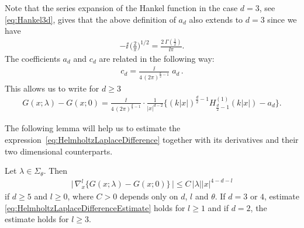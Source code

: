 Note that the series expansion of the Hankel function in the case $d = 3$, see \eqref{eq:Hankel3d}, gives that the above definition of $a_d$ also extends to $d = 3$ since we have
\begin{align*}
  -\ii\, \bigg( \frac{2}{\pi} \bigg)^{1/2} = \frac{2\, \Gamma(\frac{1}{2})}{\ii\pi}.
\end{align*}
The coefficients $a_d$ and $c_d$ are related in the following way:
\begin{align*}
  c_d 
  =\frac{\ii} {4\, (2 \pi)^{\frac{d}{2} - 1}}\; a_d \,.
\end{align*}
This allows us to write for $d \geq 3$
\begin{align}
  \label{eq:HelmholtzLaplaceDifference}
  G(x;\lambda) - G(x; 0) = \frac{\ii}{4\,(2\pi)^{\frac{d}{2} - 1}} \cdot \frac{1}{|x|^{d - 2}} \Big\{ (k|x|)^{\frac{d}{2} - 1} H_{\frac{d}{2} - 1}^{(1)}(k|x|) - a_d \Big\}.
\end{align}

The following lemma will help us to estimate the expression~\eqref{eq:HelmholtzLaplaceDifference} together with its derivatives and their two dimensional counterparts.

\begin{lem}
  \label{lem:HelmholtzLaplaceDifference}
  Let $\lambda \in \Sigma_\theta$.
  Then
  \begin{align}
    \label{eq:HelmholtzLaplaceDifferenceEstimate}
    \Big|\,\nabla_x^l \Big\{ G(x; \lambda) - G(x; 0) \Big\}\,\Big| \leq C\, |\lambda| |x|^{4 - d - l}
  \end{align}
  if $d \geq 5$ and $l \geq 0$, where $C  > 0$ depends only on $d$, $l$ and $\theta$.
  If $d = 3$ or $4$, estimate \eqref{eq:HelmholtzLaplaceDifferenceEstimate} holds for $l \geq 1$ and if $d = 2$, the estimate holds for $l \geq 3$.
\end{lem}

